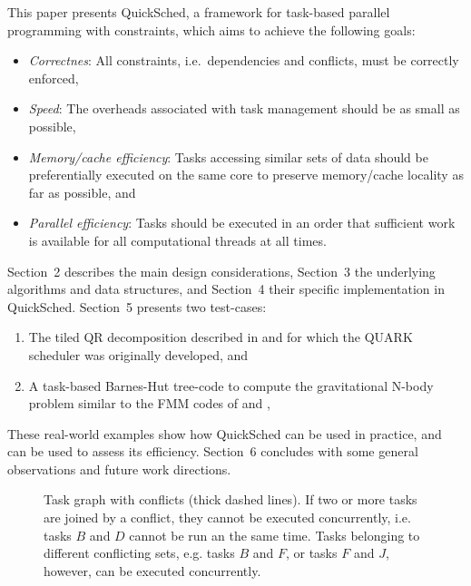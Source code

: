 \documentclass[preprint]{elsarticle}
\begin{document}
This paper presents QuickSched, a framework for task-based
parallel programming with constraints, which aims to achieve
the following goals:
\begin{itemize}
    \item {\em Correctnes}: All constraints, i.e.~dependencies and
        conflicts, must be correctly enforced,
    \item {\em Speed}: The overheads associated with task management
        should be as small as possible,
    \item {\em Memory/cache efficiency}: Tasks accessing similar
        sets of data should be preferentially executed on the
        same core to preserve memory/cache locality as far as possible, and
    \item {\em Parallel efficiency}: Tasks should be executed in an order
        that sufficient work is available for all computational
        threads at all times.
\end{itemize}
\noindent 
Section~2 describes the main design considerations, Section~3 the
underlying algorithms and data structures, and
Section~4 their specific implementation in QuickSched.
Section~5 presents two test-cases:
\begin{enumerate}
    \item The tiled QR
    decomposition described in \cite{ref:Buttari2009} and for
    which the QUARK scheduler was originally developed, and
    \item A task-based Barnes-Hut tree-code to compute the
    gravitational N-body problem similar to the FMM codes
    of \cite{ref:Ltaief2012} and \cite{ref:Agullo2013},
\end{enumerate}
These real-world examples show how QuickSched can be used in practice,
and can be used to assess its efficiency.
Section~6 concludes with some general observations and future work
directions.

\begin{figure}
    \centerline{}
    \caption{Task graph with conflicts (thick dashed lines).
        If two or more tasks are joined by a conflict, they cannot be
        executed concurrently, i.e. tasks $B$ and $D$ cannot be run an
        the same time.
        Tasks belonging to different conflicting sets, e.g. tasks $B$
        and $F$, or tasks $F$ and $J$, however, can be executed
        concurrently.}
    \label{fig:TaskConflicts}
\end{figure}
\end{document}
